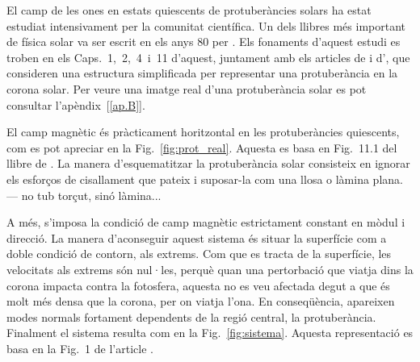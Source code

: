 El camp de les ones en estats quiescents de protuberàncies solars ha estat estudiat intensivament per la comunitat científica.
Un dels llibres més important de física solar va ser escrit en els anys 80 per \textcite{Priest_2014}.
Els fonaments d'aquest estudi es troben en els Caps.~1,~2,~4~i~11 d'aquest,
juntament amb els articles de \textcite{oscillation_modes_II} i d'\textcite{oscillations_quiescent_solar_prominence},
que consideren una estructura simplificada per representar una protuberància en la corona solar.
Per veure una imatge real d'una protuberància solar es pot consultar l'apèndix~[\ref{ap.B}].




El camp magnètic és pràcticament horitzontal en les protuberàncies quiescents, com es pot apreciar en la Fig.~\ref{fig:prot_real}. Aquesta es basa en Fig.~11.1 del llibre de \textcite{Priest_2014}.
La manera d'esquematitzar la protuberància solar consisteix en ignorar els esforços de cisallament que pateix i suposar-la com una llosa o làmina plana. --- no tub torçut, sinó làmina...

A més, s'imposa la condició de camp magnètic estrictament constant en mòdul i direcció.
La manera d'aconseguir aquest sistema és situar la superfície com a doble condició de contorn, als extrems.
Com que es tracta de la superfície, les velocitats als extrems són nul·les, perquè quan una pertorbació que viatja dins la corona impacta contra la fotosfera,
aquesta no es veu afectada degut a que és molt més densa que la corona, per on viatja l'ona.
En conseqüència, apareixen modes normals fortament dependents de la regió central, la protuberància.
Finalment el sistema resulta com en la Fig.~\ref{fig:sistema}. Aquesta representació es basa en la Fig.~1 de l'article \textcite{oscillation_modes_II}.

